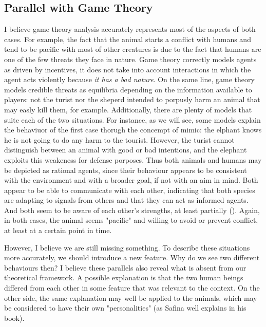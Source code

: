 \subsection*{Parallel with Game Theory}
I believe game theory analysis accurately represents most of the aspects of both cases. For example, the fact that the animal starts a conflict with humans and tend to be pacific with most of other creatures is due to the fact that humans are one of the few threats they face in nature. Game theory correctly models agents as driven by incentives, it does not take into account interactions in which the agent acts violently because \textit{it has a bad nature}. On the same line, game theory models credible threats as equilibria depending on the information available to players: not the turist nor the sheperd intended to porpusly harm an animal that may easly kill them, for example. Additionally, there are plenty of models that suite each of the two situations. For instance, as we will see, some models explain the behaviuor of the first case thorugh the concempt of mimic: the elphant knows he is not going to do any harm to the tourist. However, the turist cannot distinguish between an animal with good or bad intentions, and the elephant exploits this weakeness for defense porposes.
Thus both animals and humans may be depicted as rational agents, since their behaviour appears to be consistent with the environment and with a broader goal, if not with an aim in mind. Both appear to be able to communicate with each other, indicating that both species are adapting to signals from others and that they can act as informed agents. And both seem to be aware of each other's strengths, at least partially (\cite{smithLogicAnimalConflict1973,schellingStrategyConflict1960}). Again, in both cases, the animal seems "pacific" and willing to avoid or prevent conflict, at least at a certain point in time.

\vspace*{1em}
However, I believe we are still missing something. To describe these situations more accurately, we should introduce a new feature. Why do we see two different behaviours then? I believe these parallels also reveal what is absent from our theoretical framework.
A possible explanation is that the two human beings differed from each other in some feature that was relevant to the context. On the other side, the same explanation may well be applied to the animals, which may be considered to have their own "personalities" (as Safina well explains in his book).

